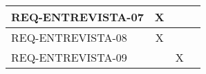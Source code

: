 \begin{table}[!htbp]
\begin{tabular}{|l|c|c|c|}
REQ-ENTREVISTA-07                   & X                                                  &                                                    &                                                                                                              \\ \hline
REQ-ENTREVISTA-08                   & X                                                  &                                                    &                                                                                                              \\ \hline
REQ-ENTREVISTA-09                   &                                                    & X                                                  &                                                                                                              \\ \hline
\end{tabular}
\end{table}

%

